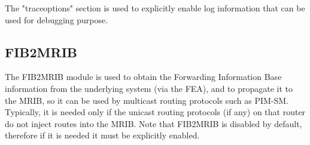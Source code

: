 \documentclass[11pt]{article}
\begin{document}
The "traceoptions" section is used to explicitly enable log information
that can be used for debugging purpose.

\subsection{FIB2MRIB}

The FIB2MRIB module is used to obtain the Forwarding Information Base
information from the underlying system (via the FEA), and to propagate
it to the MRIB, so it can be used by multicast routing protocols
such as PIM-SM. Typically, it is needed only if the unicast routing
protocols (if any) on that router do not inject routes into the MRIB.
Note that FIB2MRIB is disabled by default, therefore if it is needed
it must be explicitly enabled.


\vspace{0.1in}
\noindent{}
\vspace{0.1in}
\end{document}
